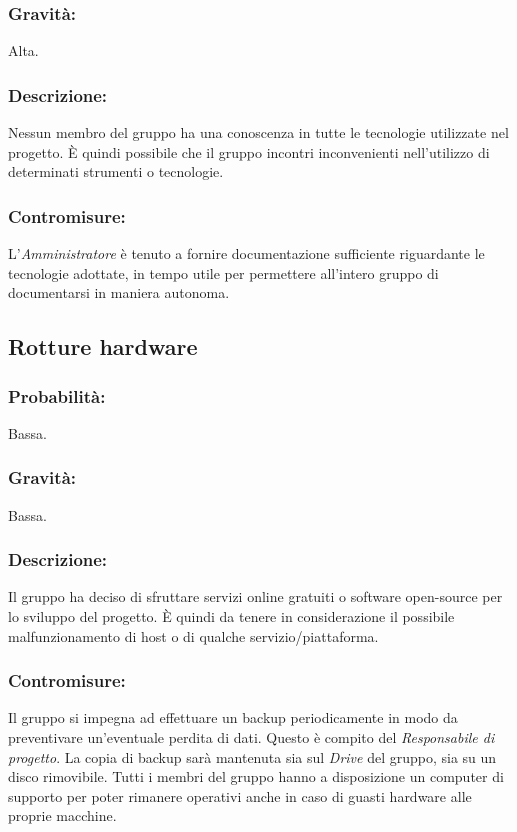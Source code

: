 \documentclass[a4paper]{report}
\begin{document}
				\subsubsection{Gravità:}
					Alta.
				\subsubsection{Descrizione:}
					Nessun membro del gruppo ha una conoscenza in tutte le tecnologie utilizzate nel 
					progetto. È quindi possibile che il gruppo incontri inconvenienti nell'utilizzo 
					di determinati strumenti o tecnologie.
				\subsubsection{Contromisure:}
					L'\emph{Amministratore} è tenuto a fornire documentazione sufficiente riguardante 
					le tecnologie adottate, in tempo utile per permettere all'intero gruppo di documentarsi 
					in maniera autonoma.
			\subsection{Rotture hardware}
				\subsubsection{Probabilità:}
					Bassa.
				\subsubsection{Gravità:}
					Bassa.
				\subsubsection{Descrizione:}
					Il gruppo ha deciso di sfruttare servizi online gratuiti o software open-source per lo 
					sviluppo del progetto. È quindi da tenere in considerazione il possibile malfunzionamento 
					di host o di qualche servizio/piattaforma.
				\subsubsection{Contromisure:}
					Il gruppo si impegna ad effettuare un backup periodicamente in modo da preventivare un'eventuale 
					perdita di dati. Questo è compito del \emph{Responsabile di progetto}. La copia di backup sarà mantenuta 
					sia sul \emph{Drive} del gruppo, sia su un disco rimovibile. Tutti i membri del gruppo hanno a disposizione 
					un computer di supporto per poter rimanere operativi anche in caso di guasti hardware alle proprie macchine.
\end{document}
